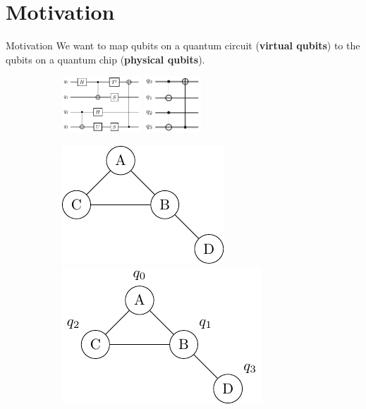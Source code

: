 \documentclass{beamer}
\begin{document}
\section{Motivation}
\begin{frame}{Motivation}
We want to map qubits on a quantum circuit (\textbf{virtual qubits}) to the qubits on a quantum chip (\textbf{physical qubits}).\\
\pause

\begin{figure}
     \centering
     \begin{subfigure}[b]{0.45\textwidth}
		\begin{overprint}
		\centering
		\includegraphics[height=60pt]{figures/default_circuit1}
		\onslide<4->\centering
		\includegraphics[height=60pt]{figures/default_circuit2}		
		\end{overprint}
     \end{subfigure}
     \hfill %
     \begin{subfigure}[b]{0.45\textwidth}
		\begin{overprint}
		\centering
		\includegraphics[scale=0.6]{figures/default_chip}
		\onslide<5>\centering
		\includegraphics[scale=0.6]{figures/default_wrong}

\end{overprint}
\end{subfigure}
\end{figure}
\end{frame}
\end{document}
